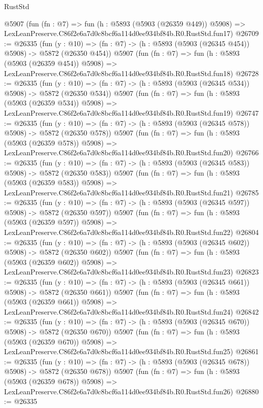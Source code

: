 \begin{lexlean}{RustStd}
\begin{coremodule}
    @5907
    (fun (fn : @7) =>
    fun (h : @5893 (@5903 (@26359 @449)) @5908) =>
    LexLeanPreserve.C86f2e6a7d0c8bcf6a114d0ee934bf84b.R0.RustStd.fun17)
@26709 := @26335
    (fun (y : @10) => (fn : @7) -> (h : @5893 (@5903 (@26345 @454)) @5908) -> @5872 (@26350 @454))
    @5907
    (fun (fn : @7) =>
    fun (h : @5893 (@5903 (@26359 @454)) @5908) =>
    LexLeanPreserve.C86f2e6a7d0c8bcf6a114d0ee934bf84b.R0.RustStd.fun18)
@26728 := @26335
    (fun (y : @10) => (fn : @7) -> (h : @5893 (@5903 (@26345 @534)) @5908) -> @5872 (@26350 @534))
    @5907
    (fun (fn : @7) =>
    fun (h : @5893 (@5903 (@26359 @534)) @5908) =>
    LexLeanPreserve.C86f2e6a7d0c8bcf6a114d0ee934bf84b.R0.RustStd.fun19)
@26747 := @26335
    (fun (y : @10) => (fn : @7) -> (h : @5893 (@5903 (@26345 @578)) @5908) -> @5872 (@26350 @578))
    @5907
    (fun (fn : @7) =>
    fun (h : @5893 (@5903 (@26359 @578)) @5908) =>
    LexLeanPreserve.C86f2e6a7d0c8bcf6a114d0ee934bf84b.R0.RustStd.fun20)
@26766 := @26335
    (fun (y : @10) => (fn : @7) -> (h : @5893 (@5903 (@26345 @583)) @5908) -> @5872 (@26350 @583))
    @5907
    (fun (fn : @7) =>
    fun (h : @5893 (@5903 (@26359 @583)) @5908) =>
    LexLeanPreserve.C86f2e6a7d0c8bcf6a114d0ee934bf84b.R0.RustStd.fun21)
@26785 := @26335
    (fun (y : @10) => (fn : @7) -> (h : @5893 (@5903 (@26345 @597)) @5908) -> @5872 (@26350 @597))
    @5907
    (fun (fn : @7) =>
    fun (h : @5893 (@5903 (@26359 @597)) @5908) =>
    LexLeanPreserve.C86f2e6a7d0c8bcf6a114d0ee934bf84b.R0.RustStd.fun22)
@26804 := @26335
    (fun (y : @10) => (fn : @7) -> (h : @5893 (@5903 (@26345 @602)) @5908) -> @5872 (@26350 @602))
    @5907
    (fun (fn : @7) =>
    fun (h : @5893 (@5903 (@26359 @602)) @5908) =>
    LexLeanPreserve.C86f2e6a7d0c8bcf6a114d0ee934bf84b.R0.RustStd.fun23)
@26823 := @26335
    (fun (y : @10) => (fn : @7) -> (h : @5893 (@5903 (@26345 @661)) @5908) -> @5872 (@26350 @661))
    @5907
    (fun (fn : @7) =>
    fun (h : @5893 (@5903 (@26359 @661)) @5908) =>
    LexLeanPreserve.C86f2e6a7d0c8bcf6a114d0ee934bf84b.R0.RustStd.fun24)
@26842 := @26335
    (fun (y : @10) => (fn : @7) -> (h : @5893 (@5903 (@26345 @670)) @5908) -> @5872 (@26350 @670))
    @5907
    (fun (fn : @7) =>
    fun (h : @5893 (@5903 (@26359 @670)) @5908) =>
    LexLeanPreserve.C86f2e6a7d0c8bcf6a114d0ee934bf84b.R0.RustStd.fun25)
@26861 := @26335
    (fun (y : @10) => (fn : @7) -> (h : @5893 (@5903 (@26345 @678)) @5908) -> @5872 (@26350 @678))
    @5907
    (fun (fn : @7) =>
    fun (h : @5893 (@5903 (@26359 @678)) @5908) =>
    LexLeanPreserve.C86f2e6a7d0c8bcf6a114d0ee934bf84b.R0.RustStd.fun26)
@26880 := @26335

\end{coremodule}
\end{lexlean}
